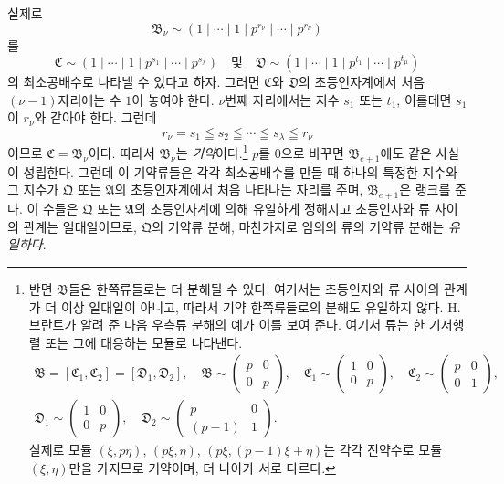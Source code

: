 실제로
\[
 \mathfrak B_\nu\sim(1\mid\cdots\mid1\mid p^{r_\nu}\mid\cdots\mid p^{r_\nu})
\]
를
\[
 \mathfrak C\sim(1\mid\cdots\mid1\mid p^{s_1}\mid\cdots\mid p^{s_\lambda})
 \quad\text{및}\quad
 \mathfrak D\sim(1\mid\cdots\mid1\mid p^{t_1}\mid\cdots\mid p^{t_\mu})
\]
의 최소공배수로 나타낼 수 있다고 하자. 그러면 $\mathfrak C$와 $\mathfrak D$의 초등인자계에서 처음 $(\nu-1)$자리에는 수 $1$이 놓여야 한다. $\nu$번째 자리에서는 지수 $s_1$ 또는 $t_1$, 이를테면 $s_1$이 $r_\nu$와 같아야 한다. 그런데
\[
 r_\nu=s_1\leqq s_2\leqq\cdots\leqq s_\lambda\leqq r_\nu
\]
이므로 $\mathfrak C=\mathfrak B_\nu$이다. 따라서 $\mathfrak B_\nu$는 \emph{기약}이다.\footnote{반면 $\mathfrak B$들은 한쪽류들로는 더 분해될 수 있다. 여기서는 초등인자와 류 사이의 관계가 더 이상 일대일이 아니고, 따라서 기약 한쪽류들로의 분해도 유일하지 않다. H. 브란트가 알려 준 다음 우측류 분해의 예가 이를 보여 준다. 여기서 류는 한 기저행렬 또는 그에 대응하는 모듈로 나타낸다.
\[
\begin{gathered}
 \mathfrak B=[\mathfrak C_1,\mathfrak C_2]=[\mathfrak D_1,\mathfrak D_2],\quad
 \mathfrak B\sim\begin{pmatrix}p&0\\0&p\end{pmatrix},\quad
 \mathfrak C_1\sim\begin{pmatrix}1&0\\0&p\end{pmatrix},\quad
 \mathfrak C_2\sim\begin{pmatrix}p&0\\0&1\end{pmatrix},\\
 \mathfrak D_1\sim\begin{pmatrix}1&0\\0&p\end{pmatrix},
 \quad
 \mathfrak D_2\sim\begin{pmatrix}p&0\\(p-1)&1\end{pmatrix}.
\end{gathered}
\]
실제로 모듈 $(\xi,p\eta)$, $(p\xi,\eta)$, $(p\xi,(p-1)\xi+\eta)$는 각각 진약수로 모듈 $(\xi,\eta)$만을 가지므로 기약이며, 더 나아가 서로 다르다.} $p$를 $0$으로 바꾸면 $\mathfrak B_{e+1}$에도 같은 사실이 성립한다. 그런데 이 기약류들은 각각 최소공배수를 만들 때 하나의 특정한 지수와 그 지수가 $\mathfrak Q$ 또는 $\mathfrak A$의 초등인자계에서 처음 나타나는 자리를 주며, $\mathfrak B_{e+1}$은 랭크를 준다. 이 수들은 $\mathfrak Q$ 또는 $\mathfrak A$의 초등인자계에 의해 유일하게 정해지고 초등인자와 류 사이의 관계는 일대일이므로, $\mathfrak Q$의 기약류 분해, 마찬가지로 임의의 류의 기약류 분해는 \emph{유일하다}.

